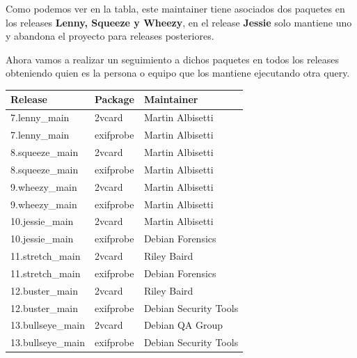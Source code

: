 \documentclass[a4paper, 12pt]{book}
\begin{document}
Como podemos ver en la tabla, este maintainer tiene asociados dos paquetes en los releases \textbf{Lenny, Squeeze y Wheezy}, en el release \textbf{Jessie} solo mantiene uno y abandona el proyecto para releases posteriores.

Ahora vamos a realizar un seguimiento a dichos paquetes en todos los releases obteniendo quien es la persona o equipo que los mantiene ejecutando otra query.
 
 \begin{table}[]
 	\begin{tabular}{|l|l|l|}
 		\hline
 		\rowcolor[HTML]{FFFE65} 
 		Release           & Package   & Maintainer            \\ \hline
 		\rowcolor[HTML]{FFFFFF} 
 		7.lenny\_main     & 2vcard    & Martin Albisetti      \\ \hline
 		\rowcolor[HTML]{FFFFFF} 
 		7.lenny\_main     & exifprobe & Martin Albisetti      \\ \hline
 		\rowcolor[HTML]{FFFFFF} 
 		8.squeeze\_main   & 2vcard    & Martin Albisetti      \\ \hline
 		\rowcolor[HTML]{FFFFFF} 
 		8.squeeze\_main   & exifprobe & Martin Albisetti      \\ \hline
 		\rowcolor[HTML]{FFFFFF} 
 		9.wheezy\_main    & 2vcard    & Martin Albisetti      \\ \hline
 		\rowcolor[HTML]{FFFFFF} 
 		9.wheezy\_main    & exifprobe & Martin Albisetti      \\ \hline
 		\rowcolor[HTML]{FFFFFF} 
 		10.jessie\_main   & 2vcard    & Martin Albisetti      \\ \hline
 		\rowcolor[HTML]{FFFFFF} 
 		10.jessie\_main   & exifprobe & Debian Forensics      \\ \hline
 		\rowcolor[HTML]{FFFFFF} 
 		11.stretch\_main  & 2vcard    & Riley Baird           \\ \hline
 		\rowcolor[HTML]{FFFFFF} 
 		11.stretch\_main  & exifprobe & Debian Forensics      \\ \hline
 		\rowcolor[HTML]{FFFFFF} 
 		12.buster\_main   & 2vcard    & Riley Baird           \\ \hline
 		\rowcolor[HTML]{FFFFFF} 
 		12.buster\_main   & exifprobe & Debian Security Tools \\ \hline
 		\rowcolor[HTML]{FFFFFF} 
 		13.bullseye\_main & 2vcard    & Debian QA Group       \\ \hline
 		\rowcolor[HTML]{FFFFFF} 
 		13.bullseye\_main & exifprobe & Debian Security Tools \\ \hline
 	\end{tabular}
 \end{table}
 
\end{document}
